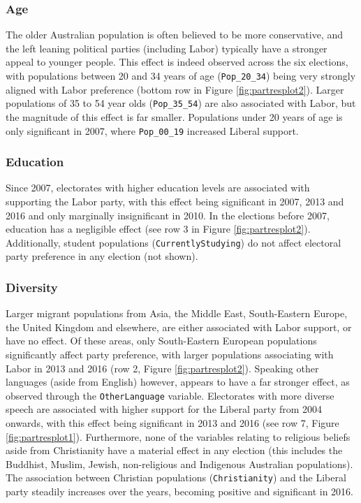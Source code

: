 \documentclass[times, doublespace]{anzsauth}
\begin{document}
\hypertarget{age}{%
\subsubsection*{Age}\label{age}}

The older Australian population is often believed to be more conservative, and the left leaning political parties (including Labor) typically have a stronger appeal to younger people. This effect is indeed observed across the six elections, with populations between 20 and 34 years of age (\texttt{Pop\_20\_34}) being very strongly aligned with Labor preference (bottom row in Figure \ref{fig:partresplot2}). Larger populations of 35 to 54 year olds (\texttt{Pop\_35\_54}) are also associated with Labor, but the magnitude of this effect is far smaller. Populations under 20 years of age is only significant in 2007, where \texttt{Pop\_00\_19} increased Liberal support.

\hypertarget{education}{%
\subsubsection*{Education}\label{education}}

Since 2007, electorates with higher education levels are associated with supporting the Labor party, with this effect being significant in 2007, 2013 and 2016 and only marginally insignificant in 2010. In the elections before 2007, education has a negligible effect (see row 3 in Figure \ref{fig:partresplot2}). Additionally, student populations (\texttt{CurrentlyStudying}) do not affect electoral party preference in any election (not shown).

\hypertarget{diversity}{%
\subsubsection*{Diversity}\label{diversity}}

Larger migrant populations from Asia, the Middle East, South-Eastern Europe, the United Kingdom and elsewhere, are either associated with Labor support, or have no effect. Of these areas, only South-Eastern European populations significantly affect party preference, with larger populations associating with Labor in 2013 and 2016 (row 2, Figure \ref{fig:partresplot2}). Speaking other languages (aside from English) however, appears to have a far stronger effect, as observed through the \texttt{OtherLanguage} variable. Electorates with more diverse speech are associated with higher support for the Liberal party from 2004 onwards, with this effect being significant in 2013 and 2016 (see row 7, Figure \ref{fig:partresplot1}). Furthermore, none of the variables relating to religious beliefs aside from Christianity have a material effect in any election (this includes the Buddhist, Muslim, Jewish, non-religious and Indigenous Australian populations). The association between Christian populations (\texttt{Christianity}) and the Liberal party steadily increases over the years, becoming positive and significant in 2016.
\end{document}
